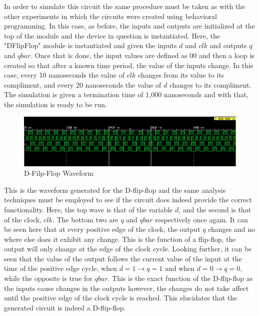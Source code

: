 \documentclass[12pt]{article}
\begin{document}
    \par In order to simulate this circuit the same procedure must be taken as
    with the other experiments in which the circuits were created using
    behavioral programming. In this case, as before, the inputs and outputs are
    initialized at the top of the module and the device in question is
    instantiated. Here, the "DFlipFlop" module is instantiated and given the
    inputs $d$ and $clk$ and outputs $q$ and $qbar$. Once that is done, the
    input values are defined as 00 and then a loop is created so that after a
    known time period, the value of the inputs change. In this case, every 10
    nanoseconds the value of $clk$ changes from its value to its compliment, and
    every 20 nanoseconds the value of $d$ changes to its compliment. The
    simulation is given a termination time of 1,000 nanoseconds and with that,
    the simulation is ready to be run.
    \begin{figure}[h]
        \centering
        \includegraphics[width=1.0\textwidth]{DFilpFlop Waveform.png}
        \caption{D-Filp-Flop Waveform}
    \end{figure}
    \par This is the waveform generated for the D-flip-flop and the same
    analysis techniques must be employed to see if the circuit does indeed
    provide the correct functionality. Here, the top wave is that of the
    variable $d$, and the second is that of the clock, $clk$. The bottom two are
    $q$ and $qbar$ respectively once again. It can be seen here that at every
    positive edge of the clock, the output $q$ changes and no where else does it
    exhibit any change. This is the function of a flip-flop, the output will
    only change at the edge of the clock cycle. Looking further, it can be seen
    that the value of the output follows the current value of the input at the
    time of the positive edge cycle, when $d=1 \to q=1$ and when $d=0 \to q=0$,
    while the opposite is true for $qbar$. This is the exact function of the
    D-flip-flop as the inputs cause changes in the outputs however, the changes
    do not take affect until the positive edge of the clock cycle is reached.
    This elucidates that the generated circuit is indeed a D-flip-flop.
\end{document}

